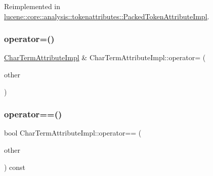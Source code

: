 Reimplemented in \mbox{\hyperlink{classlucene_1_1core_1_1analysis_1_1tokenattributes_1_1PackedTokenAttributeImpl_a9519720f5eb790ef3e796cefbcbecc96}{lucene\+::core\+::analysis\+::tokenattributes\+::\+Packed\+Token\+Attribute\+Impl}}.

\mbox{\label{classlucene_1_1core_1_1analysis_1_1tokenattributes_1_1CharTermAttributeImpl_a4a53d4368af86441243246af1722390f}} 
\subsubsection{\texorpdfstring{operator=()}{operator=()}\hspace{0.1cm}{\footnotesize\ttfamily [2/2]}}
{\footnotesize\ttfamily \mbox{\hyperlink{classlucene_1_1core_1_1analysis_1_1tokenattributes_1_1CharTermAttributeImpl}{Char\+Term\+Attribute\+Impl}} \& Char\+Term\+Attribute\+Impl\+::operator= (\begin{DoxyParamCaption}\item[{const \mbox{\hyperlink{classlucene_1_1core_1_1analysis_1_1tokenattributes_1_1CharTermAttributeImpl}{Char\+Term\+Attribute\+Impl}} \&}]{other }\end{DoxyParamCaption})}

\mbox{\label{classlucene_1_1core_1_1analysis_1_1tokenattributes_1_1CharTermAttributeImpl_a2d741886d3be18e04bcbc1fbccad62a1}} 
\subsubsection{\texorpdfstring{operator==()}{operator==()}}
{\footnotesize\ttfamily bool Char\+Term\+Attribute\+Impl\+::operator== (\begin{DoxyParamCaption}\item[{const \mbox{\hyperlink{classlucene_1_1core_1_1analysis_1_1tokenattributes_1_1CharTermAttributeImpl}{Char\+Term\+Attribute\+Impl}} \&}]{other }\end{DoxyParamCaption}) const}

